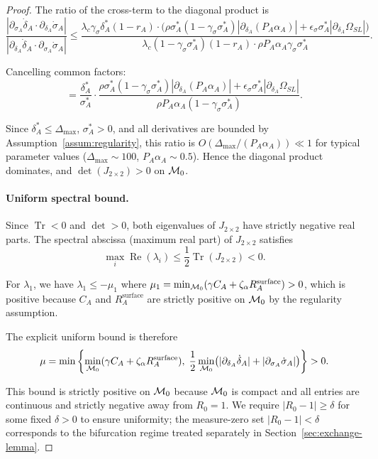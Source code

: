 \begin{proof}
The ratio of the cross-term to the diagonal product is
\[
\frac{|\partial_{\sigma_A} \dot{\delta}_A \cdot \partial_{\delta_A} \dot{\sigma}_A|}
     {|\partial_{\delta_A} \dot{\delta}_A \cdot \partial_{\sigma_A} \dot{\sigma}_A|}
\leq \frac{\lambda_c \gamma_\sigma \delta_A^* (1 - r_A) \cdot
          \bigl( \rho \sigma_A^* (1 - \gamma_\sigma \sigma_A^*) |\partial_{\delta_A}(P_A\alpha_A)|
               + \epsilon_\sigma \sigma_A^* |\partial_{\delta_A} \Omega_{SL}| \bigr)}
        {\lambda_c (1 - \gamma_\sigma \sigma_A^*)(1 - r_A) \cdot
          \rho P_A \alpha_A \gamma_\sigma \sigma_A^*}.
\]

Cancelling common factors:
\[
= \frac{\delta_A^*}{\sigma_A^*}
   \cdot \frac{\rho \sigma_A^* (1 - \gamma_\sigma \sigma_A^*) |\partial_{\delta_A}(P_A\alpha_A)|
               + \epsilon_\sigma \sigma_A^* |\partial_{\delta_A} \Omega_{SL}|}
          {\rho P_A \alpha_A (1 - \gamma_\sigma \sigma_A^*)}.
\]

Since $\delta_A^* \leq \Delta_{\max}$, $\sigma_A^* > 0$, and all
derivatives are bounded by Assumption~\ref{assum:regularity}, this ratio
is $O(\Delta_{\max} / (P_A \alpha_A)) \ll 1$ for typical parameter values
($\Delta_{\max} \sim 100$, $P_A \alpha_A \sim 0.5$). Hence the diagonal
product dominates, and $\det(J_{2\times2}) > 0$ on $\mathcal{M}_0$.

\paragraph{Uniform spectral bound.}
Since $\operatorname{Tr} < 0$ and $\det > 0$, both eigenvalues of
$J_{2\times2}$ have strictly negative real parts. The spectral abscissa
(maximum real part) of $J_{2\times2}$ satisfies
\[
\max_i \operatorname{Re}(\lambda_i) \leq \frac{1}{2} \operatorname{Tr}(J_{2\times2})
< 0.
\]

For $\lambda_1$, we have $\lambda_1 \leq -\mu_1$ where
$\mu_1 = \min_{\mathcal{M}_0} (\gamma C_A + \zeta_\alpha R_A^{\mathrm{surface}}) > 0$,
which is positive because $C_A$ and $R_A^{\mathrm{surface}}$ are strictly
positive on $\mathcal{M}_0$ by the regularity assumption.

The explicit uniform bound is therefore
\[
\mu = \min\left\{
      \min_{\mathcal{M}_0} (\gamma C_A + \zeta_\alpha R_A^{\mathrm{surface}}),\;
      \frac{1}{2} \min_{\mathcal{M}_0} \bigl(|\partial_{\delta_A} \dot{\delta}_A|
                                    + |\partial_{\sigma_A} \dot{\sigma}_A|\bigr)
      \right\} > 0.
\]

This bound is strictly positive on $\mathcal{M}_0$ because $\mathcal{M}_0$ is compact
and all entries are continuous and strictly negative away from $R_0 = 1$.
We require $|R_0 - 1| \geq \delta$ for some fixed $\delta > 0$ to ensure
uniformity; the measure-zero set $|R_0 - 1| < \delta$ corresponds to the
bifurcation regime treated separately in
Section~\ref{sec:exchange-lemma}.
\end{proof}

